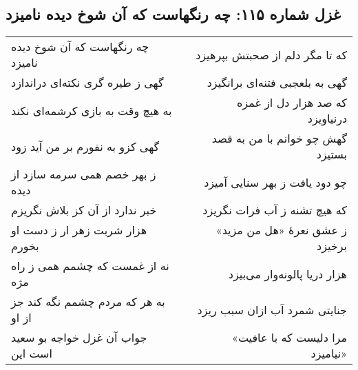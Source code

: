 \begin{center}
\section*{غزل شماره ۱۱۵: چه رنگهاست که آن شوخ دیده نامیزد}
\label{sec:115}
\begin{longtable}{l p{0.5cm} r}
چه رنگهاست که آن شوخ دیده نامیزد
&&
که تا مگر دلم از صحبتش بپرهیزد
\\
گهی ز طیره گری نکته‌ای دراندازد
&&
گهی به بلعجبی فتنه‌ای برانگیزد
\\
به هیچ وقت به بازی کرشمه‌ای نکند
&&
که صد هزار دل از غمزه درنیاویزد
\\
گهی کزو به نفورم بر من آید زود
&&
گهش چو خوانم با من به قصد بستیزد
\\
ز بهر خصم همی سرمه سازد از دیده
&&
چو دود یافت ز بهر سنایی آمیزد
\\
خبر ندارد از آن کز بلاش نگریزم
&&
که هیچ تشنه ز آب فرات نگریزد
\\
هزار شربت زهر ار ز دست او بخورم
&&
ز عشق نعرهٔ «هل من مزید» برخیزد
\\
نه از غمست که چشمم همی ز راه مژه
&&
هزار دریا پالونه‌وار می‌بیزد
\\
به هر که مردم چشمم نگه کند جز از او
&&
جنایتی شمرد آب ازان سبب ریزد
\\
جواب آن غزل خواجه بو سعید است این
&&
«مرا دلیست که با عافیت نیامیزد»
\\
\end{longtable}
\end{center}
